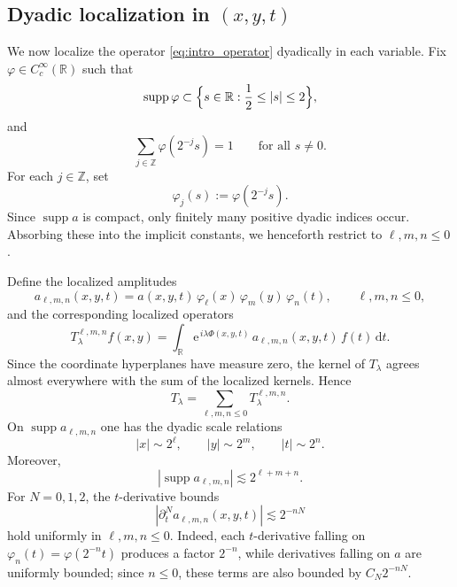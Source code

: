\documentclass[10pt]{amsart}
\numberwithin{equation}{section}
\theoremstyle{definition}
\theoremstyle{remark}
\theoremstyle{remark}
\newcommand{\R}{\mathbb{R}}
\newcommand{\Z}{\mathbb{Z}}
\newcommand{\e}{\mathrm{e}}
\newcommand{\supp}{\operatorname{supp}}
\begin{document}
	\subsection{Dyadic localization in $(x,y,t)$}\label{subsec:dyadic}
	
	We now localize the operator \eqref{eq:intro_operator} dyadically in each variable.
	Fix $\varphi\in C_c^\infty(\R)$ such that
	\begin{equation*}
		\supp\varphi \subset \Bigl\{s\in\R:\frac12\le |s|\le 2\Bigr\},
	\end{equation*}
	and
	\begin{equation*}
		\sum_{j\in\Z}\varphi(2^{-j}s)=1\qquad\text{for all }s\neq 0.
	\end{equation*}
	For each $j\in\Z$, set
	\[
	\varphi_j(s):=\varphi(2^{-j}s).
	\]
	Since $\supp a$ is compact,
    only finitely many positive dyadic indices occur.
    Absorbing these into the implicit constants,
    we henceforth restrict to $\ell,m,n\le0$.

	
	Define the localized amplitudes
	\begin{equation*}
		a_{\ell,m,n}(x,y,t)
		=
		a(x,y,t)\,\varphi_\ell(x)\,\varphi_m(y)\,\varphi_n(t),
		\qquad \ell,m,n\le0,
	\end{equation*}
	and the corresponding localized operators
	\begin{equation}\label{eq:Tlmn_def}
		T_\lambda^{\ell,m,n}f(x,y)
		=
		\int_{\R}\e^{\,i\lambda\Phi(x,y,t)}\,a_{\ell,m,n}(x,y,t)\,f(t)\,\mathrm dt.
	\end{equation}
	Since the coordinate hyperplanes have measure zero,
    the kernel of $T_\lambda$ agrees almost everywhere with the sum of the localized kernels. Hence
    \begin{equation*}
        T_\lambda=\sum_{\ell,m,n\le0}T^{\ell,m,n}_\lambda .
    \end{equation*}
	On \(\supp a_{\ell,m,n}\) one has the dyadic scale relations
	\begin{equation*}
		|x|\sim 2^\ell,\qquad |y|\sim 2^m,\qquad |t|\sim 2^n.
	\end{equation*}
	Moreover,
	\begin{equation*}
		|\supp a_{\ell,m,n}|
		\lesssim
		2^{\ell+m+n}.
	\end{equation*}
	For \(N=0,1,2\), the \(t\)-derivative bounds
	\begin{equation*}
		|\partial_t^N a_{\ell,m,n}(x,y,t)|
		\lesssim
		2^{-nN}
	\end{equation*}
	hold uniformly in \(\ell,m,n\le0\). Indeed, each \(t\)-derivative falling on \(\varphi_n(t)=\varphi(2^{-n}t)\) produces a factor \(2^{-n}\), while derivatives falling on \(a\) are uniformly bounded; since \(n\le0\), these terms are also bounded by \(C_N2^{-nN}\).
	
\end{document}
